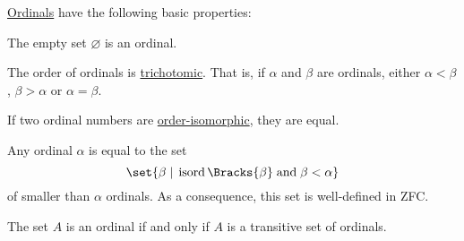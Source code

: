 \begin{proposition}\label{thm:ordinal_properties}
  \hyperref[def:ordinal]{Ordinals} have the following basic properties:
  \begin{thmenum}
     The empty set \( \varnothing \) is an ordinal.

     The order of ordinals is \hyperref[def:binary_relation/trichotomic]{trichotomic}. That is, if \( \alpha \) and \( \beta \) are ordinals, either \( \alpha < \beta \), \( \beta > \alpha \) or \( \alpha = \beta \).

     If two ordinal numbers are \hyperref[def:poset/homomorphism]{order-isomorphic}, they are equal.

     Any ordinal \( \alpha \) is equal to the set
    \begin{equation}\label{eq:thm:ordinal_properties/set_of_smaller_ordinals}
      \set{ \beta \given \op{isord}\Bracks{\beta} \T{and} \beta < \alpha }
    \end{equation}
    of smaller than \( \alpha \) ordinals. As a consequence, this set is well-defined in ZFC.

     The set \( A \) is an ordinal if and only if \( A \) is a transitive set of ordinals.
  \end{thmenum}
\end{proposition}
